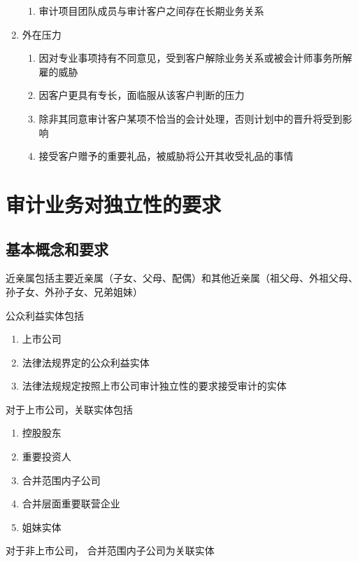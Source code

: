 \documentclass[UTF8,12pt]{ctexart}
\numberwithin{equation}{section} %
\numberwithin{figure}{section}
\numberwithin{table}{section}
\begin{document}
\begin{enumerate}
\begin{enumerate}
			\item 审计项目团队成员与审计客户之间存在长期业务关系
		\end{enumerate}
		
		\item 外在压力
		\begin{enumerate}
			\item 因对专业事项持有不同意见，受到客户解除业务关系或被会计师事务所解雇的威胁
			
			\item 因客户更具有专长，面临服从该客户判断的压力
			
			\item 除非其同意审计客户某项不恰当的会计处理，否则计划中的晋升将受到影响
			
			\item 接受客户赠予的重要礼品，被威胁将公开其收受礼品的事情
		\end{enumerate}
	\end{enumerate}
	
	
	\newpage
	
	\section{审计业务对独立性的要求}
	
	\subsection{基本概念和要求}
	近亲属包括主要近亲属（子女、父母、配偶）和其他近亲属（祖父母、外祖父母、孙子女、外孙子女、兄弟姐妹）
	
	公众利益实体包括
	\begin{enumerate}
		\item 上市公司
		
		\item 法律法规界定的公众利益实体
		
		\item 法律法规规定按照上市公司审计独立性的要求接受审计的实体
	\end{enumerate}

	对于上市公司，关联实体包括
	\begin{enumerate}
		\item 控股股东
		
		\item 重要投资人
		
		\item 合并范围内子公司
		
		\item 合并层面重要联营企业
		
		\item 姐妹实体
	\end{enumerate}
	对于非上市公司， 合并范围内子公司为关联实体
	
\end{document}
